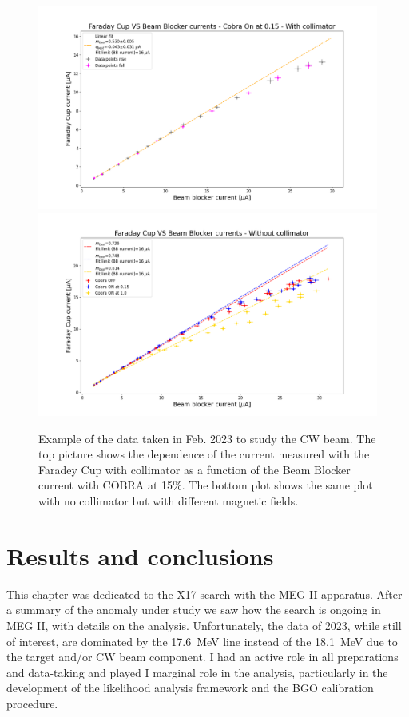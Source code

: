 \begin{refsection}
        \begin{figure}
            \centering
            \includegraphics[width = \textwidth]{Figures/X17/H2+/Faraday_Cup_VS_Beam_Blocker_currents_-_Cobra_On_at_0.15_-_With_collimator.png}\\
            \includegraphics[width = \textwidth]{Figures/X17/H2+/Faraday_Cup_VS_Beam_Blocker_currents_-_Without_collimator.png}
            \caption[X17: measurement with CW collimator]{Example of the data taken in Feb. 2023 to study the CW beam. The top picture shows the dependence of the current measured with the Faradey Cup with collimator as a function of the Beam Blocker current with COBRA at 15\%. The bottom plot shows the same plot with no collimator but with different magnetic fields.}
            \label{fig:X17:H2+}
        \end{figure}

\section{Results and conclusions}
    This chapter was dedicated to the X17 search with the MEG II apparatus.
    After a summary of the anomaly under study we saw how the search is ongoing in MEG II, with details on the analysis. 
    Unfortunately, the data of 2023, while still of interest, are dominated by the \SI{17.6}{MeV} line instead of the \SI{18.1}{MeV} due to the target and/or  CW beam component. 
    I had an active role in all preparations and data-taking and played I marginal role in the analysis, particularly in the development of the likelihood analysis framework and the BGO calibration procedure.\\
    

\end{refsection}
